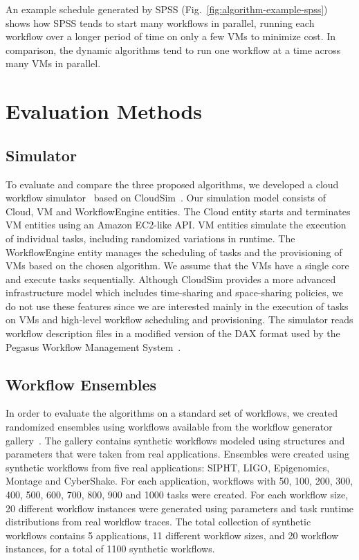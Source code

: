 \documentclass[conference]{IEEEtran}
\begin{document}
An example schedule generated by SPSS (Fig.~\ref{fig:algorithm-example-spss})
shows how SPSS tends to start many workflows in parallel, running each workflow
over a longer period of time on only a few VMs to minimize cost. In comparison,
the dynamic algorithms tend to run one workflow at a time across many VMs in
parallel.


\section{Evaluation Methods}
\label{sec:performance}


\subsection{Simulator}

To evaluate and compare the three proposed algorithms, we developed a cloud
workflow simulator~\cite{CloudWorkflowSimulator} based on CloudSim~\cite{Calheiros2011}. Our
simulation model consists of Cloud, VM and WorkflowEngine entities. The Cloud entity starts and
terminates VM entities using an Amazon EC2-like API. VM entities simulate the
execution of individual tasks, including randomized variations in runtime. The
WorkflowEngine entity manages the scheduling of tasks and the provisioning of 
VMs based on the chosen algorithm. We assume that the VMs have a single core
and execute tasks sequentially. 
Although CloudSim provides a more advanced infrastructure model which includes
time-sharing and space-sharing policies, we do not use these features since we
are interested mainly in the execution of tasks on VMs and high-level workflow
scheduling and provisioning. 
The simulator reads workflow description files in
a modified version of the DAX format used by the Pegasus Workflow Management
System~\cite{Deelman2005}. 


\subsection{Workflow Ensembles}
\label{sec:ensembles}


In order to evaluate the algorithms on a standard set of workflows, we created
randomized ensembles using workflows available from the workflow generator
gallery~\cite{WorkflowGenerator}. The
gallery contains synthetic workflows modeled using structures and parameters
that were taken from real applications. Ensembles were created using synthetic
workflows from five real applications: SIPHT, LIGO, Epigenomics, Montage and
CyberShake. For each application, workflows with 50, 100, 200, 300,
400, 500, 600, 700, 800, 900 and 1000 tasks were created. For each workflow
size, 20 different workflow instances were generated using parameters and task
runtime distributions from real workflow traces. The total collection of
synthetic workflows contains 5 applications, 11 different workflow sizes, and 20
workflow instances, for a total of 1100 synthetic workflows.
\end{document}
